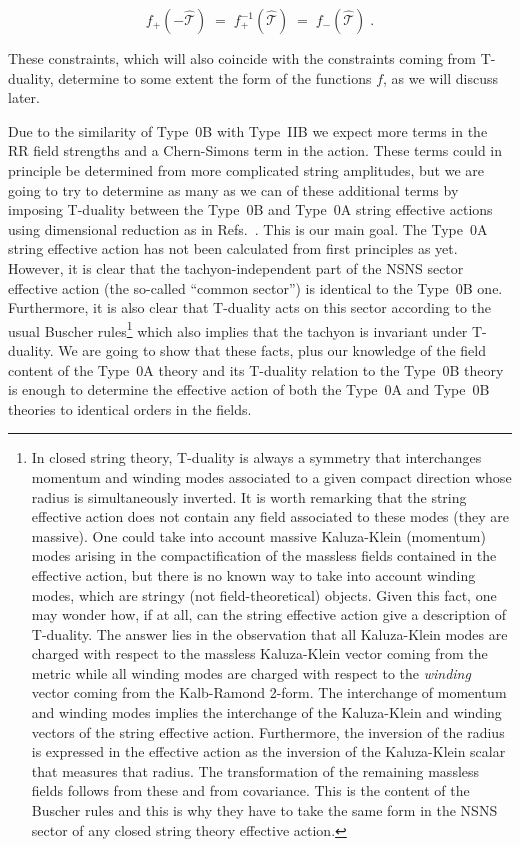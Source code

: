 \documentclass[12pt,a4paper]{article}
\begin{document}
\begin{equation}
f_{+}\left(-\hat{\mathcal{T}}\right) \;=\;
        f_{+}^{-1}\left(\hat{\mathcal{T}}\right) 
\;=\; f_{-}\left(\hat{\mathcal{T}}\right)\; .
\end{equation}

These constraints, which will also coincide with the constraints
coming from T-duality, determine to some extent the form of the
functions $f$, as we will discuss later.


Due to the similarity of Type~0B with Type~IIB we expect more terms in
the RR field strengths and a Chern-Simons term in the action. These
terms could in principle be determined from more complicated string
amplitudes, but we are going to try to determine as many as we can of
these additional terms by imposing T-duality between the Type~0B and
Type~0A string effective actions using dimensional reduction as in
Refs.~\cite{kn:BHO,kn:BRGPT,kn:MO}. This is our main goal.  The
Type~0A string effective action has not been calculated from first
principles as yet. However, it is clear that the tachyon-independent
part of the NSNS sector effective action (the so-called ``common
sector'') is identical to the Type~0B one.  Furthermore, it is also
clear that T-duality acts on this sector according to the usual
Buscher rules\footnote{In closed string theory, T-duality is always a
  symmetry that interchanges momentum and winding modes associated to
  a given compact direction whose radius is simultaneously inverted.
  It is worth remarking that the string effective action does not
  contain any field associated to these modes (they are massive). One
  could take into account massive Kaluza-Klein (momentum) modes
  arising in the compactification of the massless fields contained in
  the effective action, but there is no known way to take into account
  winding modes, which are stringy (not field-theoretical) objects.
  Given this fact, one may wonder how, if at all, can the string
  effective action give a description of T-duality. The answer lies in
  the observation that all Kaluza-Klein modes are charged with respect
  to the massless Kaluza-Klein vector coming from the metric while all
  winding modes are charged with respect to the {\it winding} vector
  coming from the Kalb-Ramond 2-form. The interchange of momentum and
  winding modes implies the interchange of the Kaluza-Klein and
  winding vectors of the string effective action. Furthermore, the
  inversion of the radius is expressed in the effective action as the
  inversion of the Kaluza-Klein scalar that measures that radius.  The
  transformation of the remaining massless fields follows from these
  and from covariance. This is the content of the Buscher rules and
  this is why they have to take the same form in the NSNS sector of
  any closed string theory effective action.}  \cite{kn:Bu} which also
implies that the tachyon is invariant under T-duality. We are going to
show that these facts, plus our knowledge of the field content of the
Type~0A theory and its T-duality relation to the Type~0B theory is
enough to determine the effective action of both the Type~0A and
Type~0B theories to identical orders in the fields.
\end{document}
